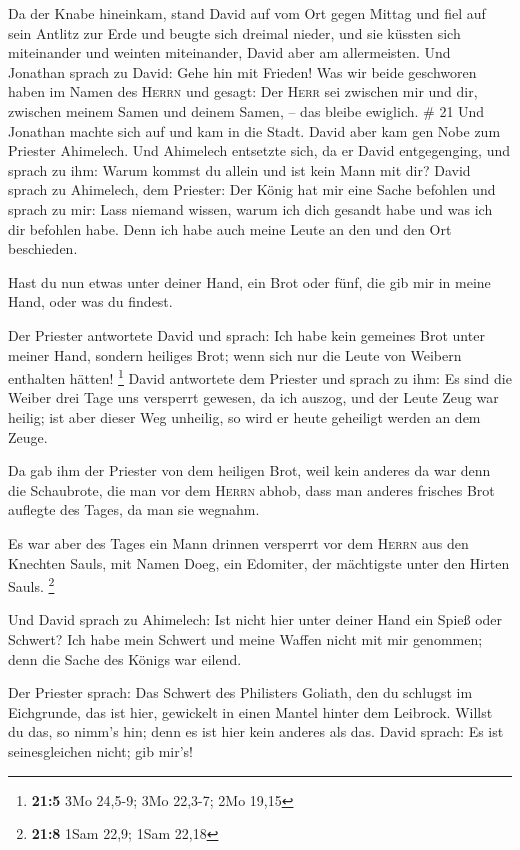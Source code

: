  Da der Knabe hineinkam, stand David auf vom Ort gegen
Mittag und fiel auf sein Antlitz zur Erde und beugte sich dreimal
nieder, und sie küssten sich miteinander und weinten miteinander, David
aber am allermeisten.  Und Jonathan sprach zu David: Gehe
hin mit Frieden! Was wir beide geschworen haben im Namen des
\textsc{Herrn} und gesagt: Der \textsc{Herr} sei zwischen mir und dir,
zwischen meinem Samen und deinem Samen, -- das bleibe ewiglich. \# 21
 Und Jonathan machte sich auf und kam in die Stadt.
 David aber kam gen Nobe zum Priester Ahimelech. Und
Ahimelech entsetzte sich, da er David entgegenging, und sprach zu ihm:
Warum kommst du allein und ist kein Mann mit dir?  David
sprach zu Ahimelech, dem Priester: Der König hat mir eine Sache befohlen
und sprach zu mir: Lass niemand wissen, warum ich dich gesandt habe und
was ich dir befohlen habe. Denn ich habe auch meine Leute an den und den
Ort beschieden.

 Hast du nun etwas unter deiner Hand, ein Brot oder fünf,
die gib mir in meine Hand, oder was du findest.

 Der Priester antwortete David und sprach: Ich habe kein
gemeines Brot unter meiner Hand, sondern heiliges Brot; wenn sich nur
die Leute von Weibern enthalten hätten! \footnote{\textbf{21:5} 3Mo
  24,5-9; 3Mo 22,3-7; 2Mo 19,15}  David antwortete dem
Priester und sprach zu ihm: Es sind die Weiber drei Tage uns versperrt
gewesen, da ich auszog, und der Leute Zeug war heilig; ist aber dieser
Weg unheilig, so wird er heute geheiligt werden an dem Zeuge.

 Da gab ihm der Priester von dem heiligen Brot, weil kein
anderes da war denn die Schaubrote, die man vor dem \textsc{Herrn}
abhob, dass man anderes frisches Brot auflegte des Tages, da man sie
wegnahm.

 Es war aber des Tages ein Mann drinnen versperrt vor dem
\textsc{Herrn} aus den Knechten Sauls, mit Namen Doeg, ein Edomiter, der
mächtigste unter den Hirten Sauls. \footnote{\textbf{21:8} 1Sam 22,9;
  1Sam 22,18}

 Und David sprach zu Ahimelech: Ist nicht hier unter
deiner Hand ein Spieß oder Schwert? Ich habe mein Schwert und meine
Waffen nicht mit mir genommen; denn die Sache des Königs war eilend.

 Der Priester sprach: Das Schwert des Philisters Goliath,
den du schlugst im Eichgrunde, das ist hier, gewickelt in einen Mantel
hinter dem Leibrock. Willst du das, so nimm's hin; denn es ist hier kein
anderes als das. David sprach: Es ist seinesgleichen nicht; gib mir's!

